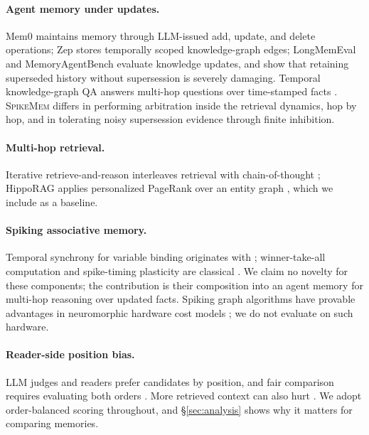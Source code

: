 \documentclass[11pt]{article}
\newcommand{\sm}{\textsc{SpikeMem}}
\begin{document}
\paragraph{Agent memory under updates.}
Mem0 \citep{chhikara2025mem0} maintains memory through LLM-issued add, update, and delete operations;
Zep \citep{rasmussen2025zep} stores temporally scoped knowledge-graph edges; LongMemEval
\citep{wu2025longmemeval} and MemoryAgentBench \citep{hu2026memoryagentbench} evaluate knowledge
updates, and \citet{yadav2026temporal} show that retaining superseded history without supersession is
severely damaging. Temporal knowledge-graph QA answers multi-hop questions over time-stamped facts
\citep{saxena2021cronkgqa}. \sm{} differs in performing arbitration inside the retrieval dynamics, hop
by hop, and in tolerating noisy supersession evidence through finite inhibition.

\paragraph{Multi-hop retrieval.}
Iterative retrieve-and-reason interleaves retrieval with chain-of-thought
\citep{trivedi2023interleaving,press2023measuring}; HippoRAG applies personalized PageRank over an
entity graph \citep{gutierrez2024hipporag}, which we include as a baseline.

\paragraph{Spiking associative memory.}
Temporal synchrony for variable binding originates with \citet{shastri1993shruti}; winner-take-all
computation and spike-timing plasticity are classical \citep{maass2000wta,caporale2008stdp}. We claim
no novelty for these components; the contribution is their composition into an agent memory for
multi-hop reasoning over updated facts. Spiking graph algorithms have provable advantages in
neuromorphic hardware cost models \citep{aimone2020neuromorphic}; we do not evaluate on such hardware.

\paragraph{Reader-side position bias.}
LLM judges and readers prefer candidates by position, and fair comparison requires evaluating both
orders \citep{wang2024fair,zheng2023judge,shi2024judges}. More retrieved context can also hurt
\citep{hsia2024ragged,cuconasu2024noise}. We adopt order-balanced scoring throughout, and
\S\ref{sec:analysis} shows why it matters for comparing memories.
\end{document}
